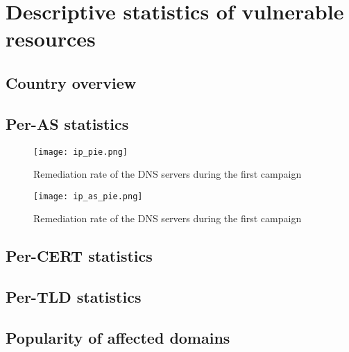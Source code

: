 \section{Descriptive statistics of vulnerable resources}
\subsection{Country overview}
\subsection{Per-AS statistics}
\begin{figure}[!hbt]
\centering
\texttt{[image: ip\_pie.png]}
\caption{Remediation rate of the DNS servers during the first campaign}
\end{figure}

\begin{figure}[!hbt]
\centering
\texttt{[image: ip\_as\_pie.png]}
\caption{Remediation rate of the DNS servers during the first campaign}
\end{figure}

\subsection{Per-CERT statistics}
\subsection{Per-TLD statistics}
\subsection{Popularity of affected domains}
